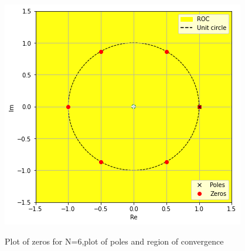 \documentclass[journal,12pt,twocolumn]{IEEEtran}
\begin{document}
\begin{enumerate}
\begin{figure}[h]
    {\includegraphics{plot.png}}
    \caption{\Large{Plot of zeros for N=6,plot of poles and region of convergence }}
\end{figure}
\end{enumerate}
\end{document}
